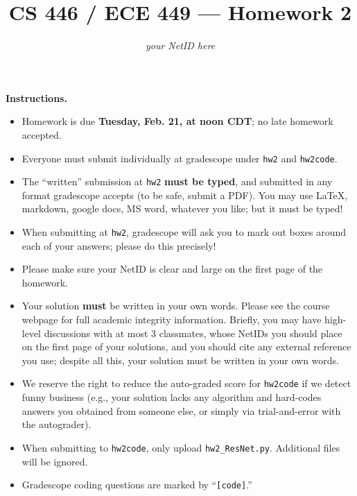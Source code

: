 \documentclass{article}
\title{CS 446 / ECE 449 --- Homework 2}
\author{\emph{your NetID here}}
\date{}
\theoremstyle{definition}
\theoremstyle{remark}
\begin{document}
	\maketitle
	
	\noindent\textbf{Instructions.}
	\begin{itemize}
		\item
		Homework is due \textbf{\color{red}Tuesday, Feb. 21, at noon CDT}; no late homework accepted.
		
		\item
		Everyone must submit individually at gradescope under \texttt{hw2} and \texttt{hw2code}.
		
		\item
		The ``written'' submission at \texttt{hw2} \textbf{must be typed}, and submitted in
		any format gradescope accepts (to be safe, submit a PDF).  You may use \LaTeX, markdown,
		google docs, MS word, whatever you like; but it must be typed!
		
		\item
		When submitting at \texttt{hw2}, gradescope will ask you to mark out boxes
		around each of your answers; please do this precisely!
		
		\item
		Please make sure your NetID is clear and large on the first page of the homework.
		
		\item
		Your solution \textbf{must} be written in your own words.
		Please see the course webpage for full academic integrity information.
		Briefly, you may have high-level discussions with at most 3 classmates,
		whose NetIDs you should place on the first page of your solutions,
		and you should cite any external reference you use; despite all this,
		your solution must be written in your own words.
		
		\item
		We reserve the right to reduce the auto-graded score for
		\texttt{hw2code} if we detect funny business (e.g., your solution
		lacks any algorithm and hard-codes answers you obtained from
		someone else, or simply via trial-and-error with the autograder).
		
		\item
		When submitting to \texttt{hw2code}, only upload \texttt{hw2\_ResNet.py}. Additional files will be ignored.
		
		\item
		Gradescope coding questions are marked by ``\texttt{[code]}.''
		
	\end{itemize}
	
	
	\begin{enumerate}[font={\Large\bfseries}]
         
        

         
		
	\end{enumerate}

\newpage



\end{document}
